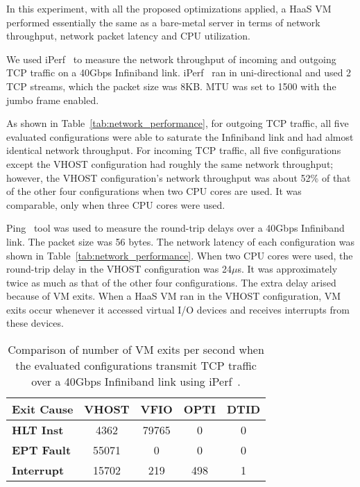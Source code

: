 In this experiment, with all the proposed optimizations
applied, a HaaS VM performed essentially the same as a
bare-metal server in terms of network throughput, network
packet latency and CPU utilization.

We used iPerf~\cite{iperf} to measure the network throughput
of incoming and outgoing TCP traffic on a 40Gbps Infiniband
link. iPerf~\cite{iperf} ran in uni-directional and used 2 TCP
streams, which the packet size was 8KB. MTU was set to 1500
with the jumbo frame enabled.

As shown in Table~\ref{tab:network_performance}, for outgoing
TCP traffic, all five evaluated configurations were able to
saturate the Infiniband link and had almost identical network
throughput. For incoming TCP traffic, all five configurations
except the VHOST configuration had roughly the same network
throughput; however, the VHOST configuration's network
throughput was about 52\% of that of the other four
configurations when two CPU cores are used. It was comparable,
only when three CPU cores were used.

Ping~\cite{ping} tool was used to measure the round-trip
delays over a 40Gbps Infiniband link. The packet size was 56
bytes. The network latency of each configuration was shown in
Table~\ref{tab:network_performance}. When two CPU cores were
used, the round-trip delay in the VHOST configuration was
24$\mu$s. It was approximately twice as much as that of the
other four configurations. The extra delay arised because of
VM exits. When a HaaS VM ran in the VHOST configuration, VM
exits occur whenever it accessed virtual I/O devices and
receives interrupts from these devices.

\begin{table}
\renewcommand{\arraystretch}{1.2}
\small
\begin{center}
\begin{tabular}{|l|c|c|c|c|} \hline
{\bf Exit Cause} & {\bf VHOST } & {\bf VFIO} & {\bf OPTI} & {\bf DTID} \\ \hline
{\bf HLT Inst}   & 4362  & 79765 & 0    & 0    \\ \hline
{\bf EPT Fault}  & 55071 & 0     & 0    & 0    \\ \hline
{\bf Interrupt}  & 15702 & 219   & 498  & 1    \\ \hline
\end{tabular}
\end{center}
\vspace{-0.1in}
\caption{Comparison of number of VM exits per second when the
evaluated configurations transmit TCP traffic over a 40Gbps
Infiniband link using iPerf~\cite{iperf}.}
\label{tab:vm_exit}
\vspace{-0.1in}
\end{table}

